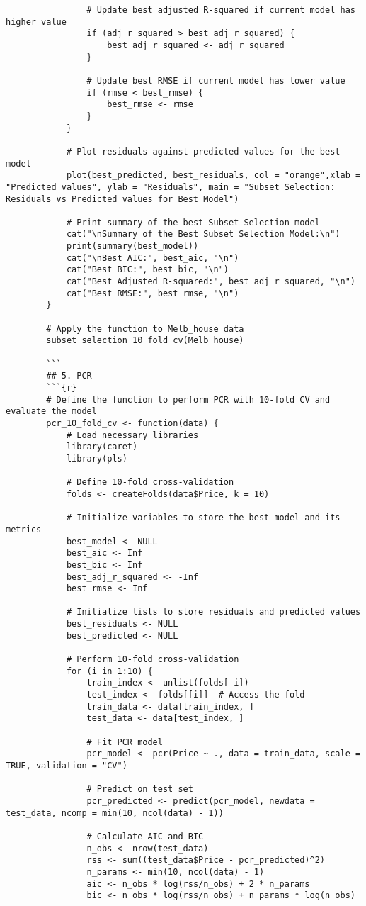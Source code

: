 \documentclass[12pt,doublespace]{article}
\begin{document}
\begin{lstlisting}
				# Update best adjusted R-squared if current model has higher value
				if (adj_r_squared > best_adj_r_squared) {
					best_adj_r_squared <- adj_r_squared
				}
				
				# Update best RMSE if current model has lower value
				if (rmse < best_rmse) {
					best_rmse <- rmse
				}
			}
			
			# Plot residuals against predicted values for the best model
			plot(best_predicted, best_residuals, col = "orange",xlab = "Predicted values", ylab = "Residuals", main = "Subset Selection: Residuals vs Predicted values for Best Model")
			
			# Print summary of the best Subset Selection model
			cat("\nSummary of the Best Subset Selection Model:\n")
			print(summary(best_model))
			cat("\nBest AIC:", best_aic, "\n")
			cat("Best BIC:", best_bic, "\n")
			cat("Best Adjusted R-squared:", best_adj_r_squared, "\n")
			cat("Best RMSE:", best_rmse, "\n")
		}
		
		# Apply the function to Melb_house data
		subset_selection_10_fold_cv(Melb_house)
		
		```
		## 5. PCR
		```{r}
		# Define the function to perform PCR with 10-fold CV and evaluate the model
		pcr_10_fold_cv <- function(data) {
			# Load necessary libraries
			library(caret)
			library(pls)
			
			# Define 10-fold cross-validation
			folds <- createFolds(data$Price, k = 10)
			
			# Initialize variables to store the best model and its metrics
			best_model <- NULL
			best_aic <- Inf
			best_bic <- Inf
			best_adj_r_squared <- -Inf
			best_rmse <- Inf
			
			# Initialize lists to store residuals and predicted values
			best_residuals <- NULL
			best_predicted <- NULL
			
			# Perform 10-fold cross-validation
			for (i in 1:10) {
				train_index <- unlist(folds[-i])
				test_index <- folds[[i]]  # Access the fold
				train_data <- data[train_index, ]
				test_data <- data[test_index, ]
				
				# Fit PCR model
				pcr_model <- pcr(Price ~ ., data = train_data, scale = TRUE, validation = "CV")
				
				# Predict on test set
				pcr_predicted <- predict(pcr_model, newdata = test_data, ncomp = min(10, ncol(data) - 1))
				
				# Calculate AIC and BIC
				n_obs <- nrow(test_data)
				rss <- sum((test_data$Price - pcr_predicted)^2)
				n_params <- min(10, ncol(data) - 1)
				aic <- n_obs * log(rss/n_obs) + 2 * n_params
				bic <- n_obs * log(rss/n_obs) + n_params * log(n_obs)
				

\end{lstlisting}
\end{document}
